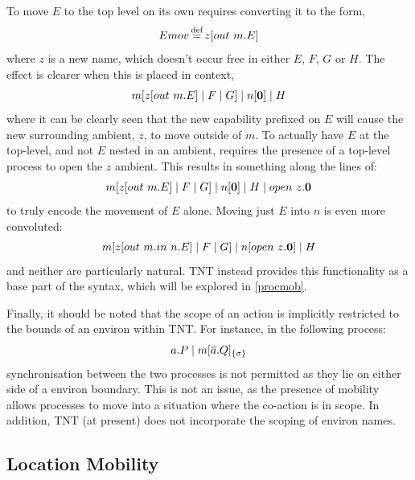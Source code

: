 To move $E$ to the top level on its own requires converting it to the
form,
\begin{equation}
Emov \operatorname{\stackrel{\textrm{def}}{=}} z[out\ m.E]
\end{equation}
where $z$ is a new name, which doesn't occur free in either
$E$, $F$, $G$ or $H$.  The effect is clearer when this is placed in
context,
\begin{equation}
m[z[out\ m.E]\;|\;F\;|\;G]\;|\;n[\textbf{0}]\;|\;H
\end{equation}
where it can be clearly seen that the new capability prefixed
on $E$ will cause the new surrounding ambient, $z$, to move outside of
$m$.  To actually have $E$ at the top-level, and not $E$ nested in an
ambient, requires the presence of a top-level process to open the $z$
ambient.  This results in something along the lines of:
\begin{equation}
m[z[out\ m.E]\;|\;F\;|\;G]\;|\;n[\textbf{0}]\;|\;H\;|\;open\ z.\textbf{0}
\end{equation}
to truly encode the movement of $E$ alone.  Moving just $E$
into $n$ is even more convoluted:
\begin{equation}
m[z[out\ m.in\ n.E]\;|\;F\;|\;G]\;|\;n[open\ z.\textbf{0}]\;|\;H
\end{equation}
and neither are particularly natural.  TNT instead provides
this functionality as a base part of the syntax, which will be explored
in \ref{procmob}.  

Finally, it should be noted that the scope of an action is implicitly
restricted to the bounds of an environ within TNT.  For instance, in the
following process:
\begin{equation}
a.P \;|\; {m}[ \overline{a}.Q ]_{\{\sigma\}}
\end{equation}
synchronisation between the two processes is not permitted as
they lie on either side of a environ boundary.  This is not an issue,
as the presence of mobility allows processes to move into a situation
where the co-action is in scope.  In addition, TNT (at present) does not
incorporate the scoping of environ names.

\subsection{Location Mobility}
\label{locmob}

